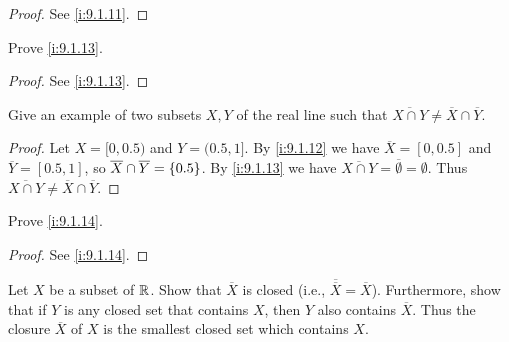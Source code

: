 \begin{proof}
  See \cref{i:9.1.11}.
\end{proof}

\begin{ex}\label{i:ex:9.1.3}
  Prove \cref{i:9.1.13}.
\end{ex}

\begin{proof}
  See \cref{i:9.1.13}.
\end{proof}

\begin{ex}\label{i:ex:9.1.4}
  Give an example of two subsets \(X, Y\) of the real line such that \(\overline{X \cap Y} \neq \overline{X} \cap \overline{Y}\).
\end{ex}

\begin{proof}
  Let \(X = [0, 0.5)\) and \(Y = (0.5, 1]\).
  By \cref{i:9.1.12} we have \(\overline{X} = [0, 0.5]\) and \(\overline{Y} = [0.5, 1]\), so \(\overline{X} \cap \overline{Y} = \left\lbrace0.5\right\rbrace\).
  By \cref{i:9.1.13} we have \(\overline{X \cap Y} = \overline{\emptyset} = \emptyset\).
  Thus \(\overline{X \cap Y} \neq \overline{X} \cap \overline{Y}\).
\end{proof}

\begin{ex}\label{i:ex:9.1.5}
  Prove \cref{i:9.1.14}.
\end{ex}

\begin{proof}
  See \cref{i:9.1.14}.
\end{proof}

\begin{ex}\label{i:ex:9.1.6}
  Let \(X\) be a subset of \(\mathbb{R}\).
  Show that \(\overline{X}\) is closed (i.e., \(\overline{\overline{X}} = \overline{X}\)).
  Furthermore, show that if \(Y\) is any closed set that contains \(X\), then \(Y\) also contains \(\overline{X}\).
  Thus the closure \(\overline{X}\) of \(X\) is the smallest closed set which contains \(X\).
\end{ex}

